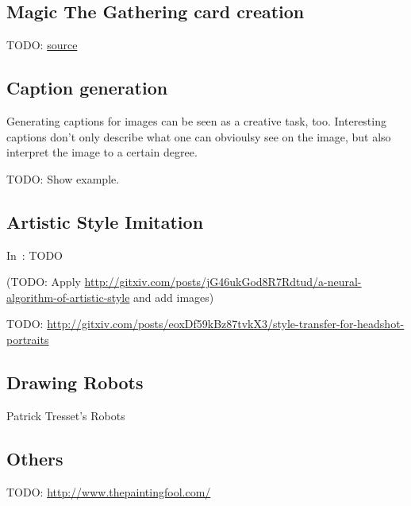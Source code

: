 \subsection{Magic The Gathering card creation}

TODO: \href{http://nerdist.com/what-happens-when-artificial-intelligence-makes-magic-the-gathering-cards/}{source}


\subsection{Caption generation}
Generating captions for images can be seen as a creative task, too. Interesting
captions don't only describe what one can obvioulsy see on the image, but also
interpret the image to a certain degree.

TODO: Show example.


\subsection{Artistic Style Imitation}
In~\cite{gatys2015neural}: TODO

(TODO: Apply \href{http://gitxiv.com/posts/jG46ukGod8R7Rdtud/a-neural-algorithm-of-artistic-style}{http://gitxiv.com/posts/jG46ukGod8R7Rdtud/a-neural-algorithm-of-artistic-style} and add images)



TODO: \cite{shih2014style} \href{http://gitxiv.com/posts/eoxDf59kBz87tvkX3/style-transfer-for-headshot-portraits}{http://gitxiv.com/posts/eoxDf59kBz87tvkX3/style-transfer-for-headshot-portraits}

\subsection{Drawing Robots}
Patrick Tresset's Robots

\subsection{Others}

TODO: \href{http://www.thepaintingfool.com/}{http://www.thepaintingfool.com/}